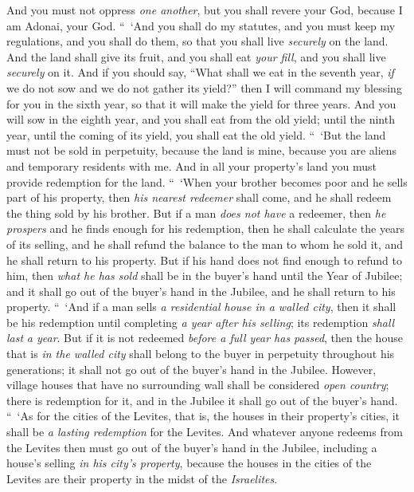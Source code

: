 \begin{biblechapter}
\verse And you must not oppress \textit{one another}, but you shall revere your God, because I am Adonai, your God.
\verse “ ‘And you shall do my statutes, and you must keep my regulations, and you shall do them, so that you shall live \textit{securely} on the land.
\verse And the land shall give its fruit, and you shall eat \textit{your fill}, and you shall live \textit{securely} on it.
\verse And if you should say, “What shall we eat in the seventh year, \textit{if} we do not sow and we do not gather its yield?”
\verse then I will command my blessing for you in the sixth year, so that it will make the yield for three years.
\verse And you will sow in the eighth year, and you shall eat from the old yield; until the ninth year, until the coming of its yield, you shall eat the old yield.
\verse “ ‘But the land must not be sold in perpetuity, because the land is mine, because you are aliens and temporary residents with me.
\verse And in all your property’s land you must provide redemption for the land.
\verse “ ‘When your brother becomes poor and he sells part of his property, then \textit{his nearest redeemer} shall come, and he shall redeem the thing sold by his brother.
\verse But if a man \textit{does not have} a redeemer, then \textit{he prospers} and he finds enough for his redemption,
\verse then he shall calculate the years of its selling, and he shall refund the balance to the man to whom he sold it, and he shall return to his property.
\verse But if his hand does not find enough to refund to him, then \textit{what he has sold} shall be in the buyer’s hand until the Year of Jubilee; and it shall go out of the buyer’s hand in the Jubilee, and he shall return to his property.
\verse “ ‘And if a man sells \textit{a residential house in a walled city}, then it shall be his redemption until completing \textit{a year after his selling}; its redemption \textit{shall last} \textit{a year}.
\verse But if it is not redeemed \textit{before a full year has passed}, then the house that is \textit{in the walled city} shall belong to the buyer in perpetuity throughout his generations; it shall not go out of the buyer’s hand in the Jubilee.
\verse However, village houses that have no surrounding wall shall be considered \textit{open country}; there is redemption for it, and in the Jubilee it shall go out of the buyer’s hand.
\verse “ ‘As for the cities of the Levites, that is, the houses in their property’s cities, it shall be \textit{a lasting redemption} for the Levites.
\verse And whatever anyone redeems from the Levites then must go out of the buyer’s hand in the Jubilee, including a house’s selling \textit{in his city’s property}, because the houses in the cities of the Levites are their property in the midst of the \textit{Israelites}.

\end{biblechapter}

